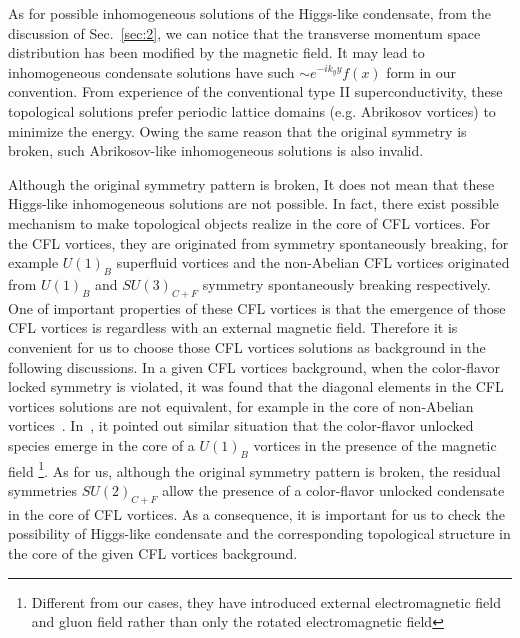 \documentclass[12pt]{article}
\begin{document}
As for possible inhomogeneous solutions of the
Higgs-like condensate,
from the discussion of Sec.~\ref{sec:2}, we can notice that the
transverse momentum space distribution has been modified by 
the magnetic field.
It may lead to  inhomogeneous condensate solutions 
have such $\sim e^{-ik_y y}f(x)$ form in our convention.
From experience of the conventional type II superconductivity,
these topological solutions
prefer periodic lattice domains (e.g. Abrikosov vortices) to minimize the energy.
Owing the same reason that 
the original symmetry is broken, such Abrikosov-like inhomogeneous solutions
is also invalid.




  



Although the original symmetry pattern  is broken,
It does not mean that these Higgs-like inhomogeneous solutions are not possible.
In fact, there exist possible mechanism to  make
 topological objects realize in the core of CFL vortices. 
For the CFL vortices, they are originated from symmetry spontaneously breaking, 
for example  $U(1)_B$ superfluid vortices and the non-Abelian CFL vortices
originated from $U(1)_B$ 
and $SU(3)_{C+F}$ symmetry spontaneously breaking respectively.
One of important properties of these CFL vortices is that
the emergence of those CFL vortices is regardless with an external magnetic field.
Therefore it is convenient for us to choose
those CFL vortices solutions as background in the following discussions.
In a given CFL vortices background, when the color-flavor locked symmetry is violated,
it was found that
the diagonal elements in the CFL vortices solutions are not equivalent, 
for example in the core of
non-Abelian vortices~\cite{balachandran2006semisuperfluid,nakano2008non,eto2009color}.
In~\cite{iida2005magnetic}, it  pointed out similar situation that the color-flavor
unlocked species  emerge in the core of a $U(1)_B$ vortices in the presence of the magnetic field
\footnote{Different from our cases, they have introduced external electromagnetic field and
gluon field rather than only the rotated electromagnetic field}.
As for us, although the original symmetry pattern is broken, the residual symmetries $SU(2)_{C+F}$
allow the presence of a color-flavor unlocked condensate in the core of
CFL vortices.
As a consequence,
it is important for us to check the possibility of Higgs-like condensate and the corresponding
topological structure in the core of the given CFL vortices background.


\end{document}
